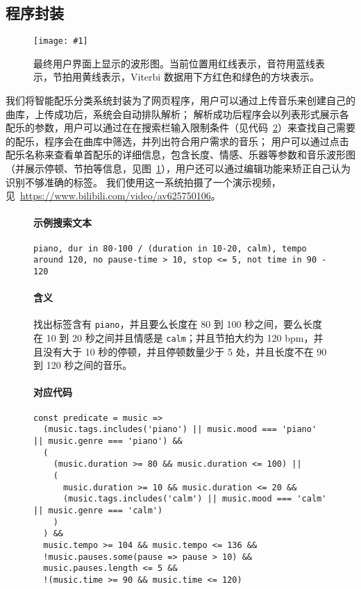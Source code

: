 \documentclass[a4paper,utf8,10pt]{article}
\newcommand{\somefigure}[4]{
  \begin{figure}[#4]
    \begin{center}
      \vspace{-10pt}
      \texttt{[image: \#1]}
      \vspace{-10pt}
      \caption{#2}
      \label{#3}
      \vspace{-10pt}
    \end{center}
  \end{figure}
}
\begin{document}
\subsection{程序封装}

\somefigure{images/wave.1522x434.jpg}{最终用户界面上显示的波形图。当前位置用红线表示，音符用蓝线表示，节拍用黄线表示，Viterbi 数据用下方红色和绿色的方块表示。}{fig:wave}{h}

我们将智能配乐分类系统封装为了网页程序，用户可以通过上传音乐来创建自己的曲库，上传成功后，系统会自动排队解析；
解析成功后程序会以列表形式展示各配乐的参数，用户可以通过在在搜索栏输入限制条件（见代码~\ref{lst:search}）来查找自己需要的配乐，程序会在曲库中筛选，并列出符合用户需求的音乐；
用户可以通过点击配乐名称来查看单首配乐的详细信息，包含长度、情感、乐器等参数和音乐波形图（并展示停顿、节拍等信息，见图~\ref{fig:wave}），用户还可以通过编辑功能来矫正自己认为识别不够准确的标签。
我们使用这一系统拍摄了一个演示视频，见~\url{https://www.bilibili.com/video/av625750106}。

\begin{figure}[h]
 \label{lst:search}
\paragraph{示例搜索文本} \texttt{piano, dur in 80-100 / (duration in 10-20, calm), tempo around 120, no pause-time > 10, stop <= 5, not time in 90 - 120}
\paragraph{含义} 找出标签含有 \texttt{piano}，并且要么长度在 80 到 100 秒之间，要么长度在 10 到 20 秒之间并且情感是 \texttt{calm}；并且节拍大约为 120 bpm，并且没有大于 10 秒的停顿，并且停顿数量少于 5 处，并且长度不在 90 到 120 秒之间的音乐。
\paragraph{对应代码}
\begin{verbatim}
const predicate = music =>
  (music.tags.includes('piano') || music.mood === 'piano' || music.genre === 'piano') &&
  (
    (music.duration >= 80 && music.duration <= 100) ||
    (
      music.duration >= 10 && music.duration <= 20 &&
      (music.tags.includes('calm') || music.mood === 'calm' || music.genre === 'calm')
    )
  ) &&
  music.tempo >= 104 && music.tempo <= 136 &&
  !music.pauses.some(pause => pause > 10) &&
  music.pauses.length <= 5 &&
  !(music.time >= 90 && music.time <= 120)
\end{verbatim}
\end{figure}
\end{document}
